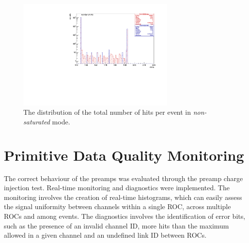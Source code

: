 \begin{figure}[!h]
\centering
\includegraphics[width =0.7\textwidth]{figures/pdf/figure_00009_nhits_105038.pdf}
\caption{
  The distribution of the total number of hits per event in \textit{non-saturated} mode.
}
\label{fig:6}
\end{figure}


\section{Primitive Data Quality Monitoring}\label{dqm}

The correct behaviour of the preamps was evaluated through the preamp charge injection test. 
Real-time monitoring and diagnostics were implemented.
The monitoring involves the creation of real-time histograms, which can easily assess 
the signal uniformity between channels within a single ROC, across multiple ROCs and among events.
The diagnostics involves the identification of error bits, such as the presence of an 
invalid channel ID, more hits than the maximum allowed in a given channel and an undefined link ID between ROCs.

